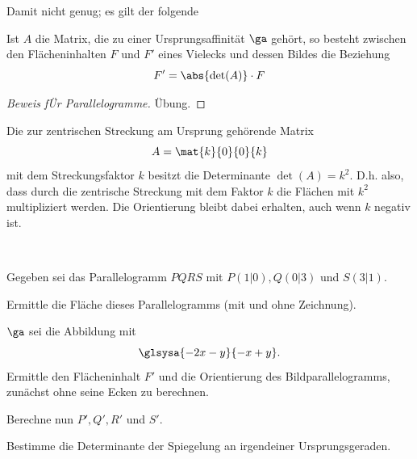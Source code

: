 \documentclass[%
11pt,%
twoside,%
titlepage,%
german,%
headsepline%
]{scrartcl}
\begin{document}
Damit nicht genug; es gilt der folgende

\begin{satz}
Ist $A$ die Matrix, die zu einer Ursprungsaffinität $\ga$ gehört, so besteht zwischen den
Flächeninhalten $F$ und $F'$ eines Vielecks und dessen Bildes die Beziehung
$$F'=\abs{\det(A)}\cdot F$$
\end{satz}

\begin{proof}[Beweis f\"Ur Parallelogramme]
\"Ubung.
\end{proof}

\begin{bsp}
Die zur zentrischen Streckung am Ursprung gehörende Matrix
$$A=\mat{k}{0}{0}{k}$$
mit dem Streckungsfaktor $k$ besitzt die Determinante $\det(A) = k^2$. D.h. also, dass durch die zentrische Streckung mit dem Faktor $k$ die Flächen mit $k^2$ multipliziert werden. Die Orientierung bleibt dabei erhalten, auch wenn $k$ negativ ist.
\end{bsp}

\begin{ueb}
\ \\[-4ex]
\begin{enumeratea}
\item Gegeben sei das Parallelogramm $PQRS$ mit $P(1|0), Q(0|3)$ und $S(3|1)$.
\begin{enumeratei}
\item Ermittle die Fläche dieses Parallelogramms (mit und ohne Zeichnung).
\item $\ga$ sei die Abbildung mit
$$\glsysa{-2x-y}{-x+y}.$$
Ermittle den Flächeninhalt $F'$ und die Orientierung des Bildparallelogramms, zunächst ohne seine Ecken zu berechnen.
\item Berechne nun $P', Q', R'$ und $S'$.
\end{enumeratei}
\begin{center}
\end{center}
\item Bestimme die Determinante der Spiegelung an irgendeiner Ursprungsgeraden.
\end{enumeratea}
\end{ueb}
\end{document}
